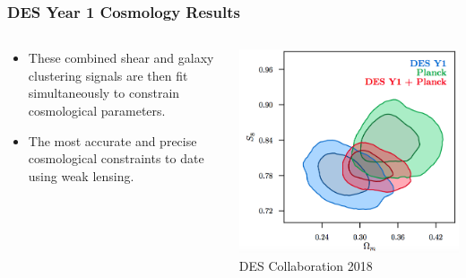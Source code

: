 \documentclass[aspectratio=169]{beamer}
\begin{document}
\frame
{

    \frametitle{DES Year 1 Cosmology Results}


    \begin{columns}
        \begin{column}{0.5\textwidth}
            \begin{itemize}

                \item These combined shear and galaxy clustering signals
                    are then fit simultaneously to constrain cosmological
                    parameters.

                \item The most accurate and precise cosmological
                    constraints to date using weak lensing.


            \end{itemize}

        \end{column}
        \begin{column}{0.5\textwidth}
            \centering
                \includegraphics[width=\linewidth]{3x2-fig10.png}
                \newline
                {\tiny DES Collaboration 2018}
        \end{column}

    \end{columns}

}
\end{document}
